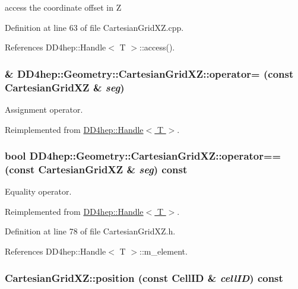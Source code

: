 access the coordinate offset in Z 

Definition at line 63 of file CartesianGridXZ.cpp.

References DD4hep::Handle$<$ T $>$::access().\hypertarget{class_d_d4hep_1_1_geometry_1_1_cartesian_grid_x_z_a07eeb7b46619fe93bf00acafb09989d0}{
\subsubsection[{operator=}]{\& DD4hep::Geometry::CartesianGridXZ::operator= (const {\bf CartesianGridXZ} \& {\em seg})}}
\label{class_d_d4hep_1_1_geometry_1_1_cartesian_grid_x_z_a07eeb7b46619fe93bf00acafb09989d0}


Assignment operator. 

Reimplemented from \hyperlink{class_d_d4hep_1_1_handle_a9bbf8f498df42e81ad26fb00233505a6}{DD4hep::Handle$<$ T $>$}.\hypertarget{class_d_d4hep_1_1_geometry_1_1_cartesian_grid_x_z_a6ebac42f6146d34bc9e83729e4bf279b}{
\subsubsection[{operator==}]{\setlength{\rightskip}{0pt plus 5cm}bool DD4hep::Geometry::CartesianGridXZ::operator== (const {\bf CartesianGridXZ} \& {\em seg}) const}}
\label{class_d_d4hep_1_1_geometry_1_1_cartesian_grid_x_z_a6ebac42f6146d34bc9e83729e4bf279b}


Equality operator. 

Reimplemented from \hyperlink{class_d_d4hep_1_1_handle_a618470283b3a2cc5ed0545fec90dc759}{DD4hep::Handle$<$ T $>$}.

Definition at line 78 of file CartesianGridXZ.h.

References DD4hep::Handle$<$ T $>$::m\_\-element.\hypertarget{class_d_d4hep_1_1_geometry_1_1_cartesian_grid_x_z_a6203b834d764c9d769f407566cff4a75}{
\subsubsection[{position}]{ CartesianGridXZ::position (const CellID \& {\em cellID}) const}}
\label{class_d_d4hep_1_1_geometry_1_1_cartesian_grid_x_z_a6203b834d764c9d769f407566cff4a75}


